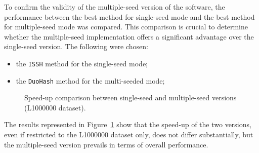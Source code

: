 	To confirm the validity of the multiple-seed version of the software, the performance between the best method for single-seed mode and the best method for multiple-seed mode was compared. This comparison is crucial to determine whether the multiple-seed implementation offers a significant advantage over the single-seed version. The following were chosen:
	\begin{itemize}
		\item the \verb|ISSH| method for the single-seed mode;
		\item the \verb|DuoHash| method for the multi-seeded mode;
	\end{itemize}
	
	
	\begin{figure}[!ht]
		\centering
		\caption{Speed-up comparison between single-seed and multiple-seed versions (L1000000 dataset).}
		\label{fig:single-vs-multi-seed}
	\end{figure}
	
	The results represented in Figure~\ref{fig:single-vs-multi-seed} show that the speed-up of the two versions, even if restricted to the L1000000 dataset only, does not differ substantially, but the multiple-seed version prevails in terms of overall performance.

